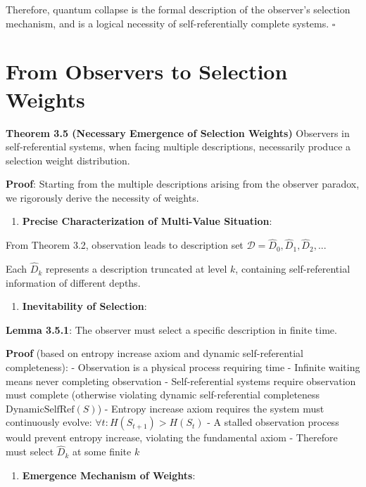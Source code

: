 Therefore, quantum collapse is the formal description of the observer's selection mechanism, and is a logical necessity of self-referentially complete systems. $\square$

\section{From Observers to Selection Weights}
\label{sec:ch03_quantum:from-observers-to-selection-weights}

\textbf{Theorem 3.5 (Necessary Emergence of Selection Weights)}
\label{thm:3.5}
Observers in self-referential systems, when facing multiple descriptions, necessarily produce a selection weight distribution.

\textbf{Proof}:
Starting from the multiple descriptions arising from the observer paradox, we rigorously derive the necessity of weights.

\begin{enumerate}
\item \textbf{Precise Characterization of Multi-Value Situation}:
\end{enumerate}
   From Theorem 3.2, observation leads to description set $\mathcal{D} = {\hat{D}_0, \hat{D}_1, \hat{D}_2, ...}$
   
   Each $\hat{D}_k$ represents a description truncated at level $k$, containing self-referential information of different depths.

\begin{enumerate}
\item \textbf{Inevitability of Selection}:
\end{enumerate}
   
   \textbf{Lemma 3.5.1}: The observer must select a specific description in finite time.
\label{lemma:3.5.1}
   
   \textbf{Proof} (based on entropy increase axiom and dynamic self-referential completeness):
   - Observation is a physical process requiring time
   - Infinite waiting means never completing observation
   - Self-referential systems require observation must complete (otherwise violating dynamic self-referential completeness $\text{DynamicSelfRef}(S)$)
   - Entropy increase axiom requires the system must continuously evolve: $\forall t: H(S_{t+1}) > H(S_t)$
   - A stalled observation process would prevent entropy increase, violating the fundamental axiom
   - Therefore must select $\hat{D}_k$ at some finite $k$

\begin{enumerate}
\item \textbf{Emergence Mechanism of Weights}:
\end{enumerate}
   
